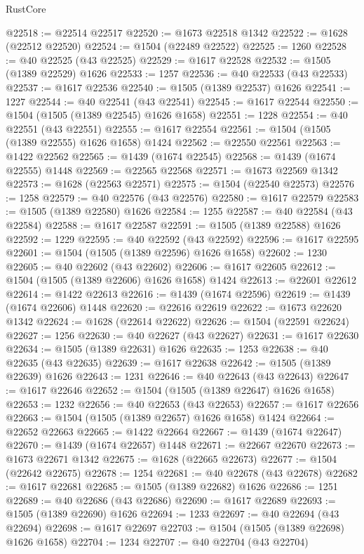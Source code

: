 \begin{lexlean}{RustCore}
\begin{coremodule}
@22518 := @22514 @22517
@22520 := @1673 @22518 @1342
@22522 := @1628 (@22512 @22520)
@22524 := @1504 (@22489 @22522)
@22525 := 1260
@22528 := @40 @22525 (@43 @22525)
@22529 := @1617 @22528
@22532 := @1505 (@1389 @22529) @1626
@22533 := 1257
@22536 := @40 @22533 (@43 @22533)
@22537 := @1617 @22536
@22540 := @1505 (@1389 @22537) @1626
@22541 := 1227
@22544 := @40 @22541 (@43 @22541)
@22545 := @1617 @22544
@22550 := @1504 (@1505 (@1389 @22545) @1626 @1658)
@22551 := 1228
@22554 := @40 @22551 (@43 @22551)
@22555 := @1617 @22554
@22561 := @1504 (@1505 (@1389 @22555) @1626 @1658) @1424
@22562 := @22550 @22561
@22563 := @1422 @22562
@22565 := @1439 (@1674 @22545)
@22568 := @1439 (@1674 @22555) @1448
@22569 := @22565 @22568
@22571 := @1673 @22569 @1342
@22573 := @1628 (@22563 @22571)
@22575 := @1504 (@22540 @22573)
@22576 := 1258
@22579 := @40 @22576 (@43 @22576)
@22580 := @1617 @22579
@22583 := @1505 (@1389 @22580) @1626
@22584 := 1255
@22587 := @40 @22584 (@43 @22584)
@22588 := @1617 @22587
@22591 := @1505 (@1389 @22588) @1626
@22592 := 1229
@22595 := @40 @22592 (@43 @22592)
@22596 := @1617 @22595
@22601 := @1504 (@1505 (@1389 @22596) @1626 @1658)
@22602 := 1230
@22605 := @40 @22602 (@43 @22602)
@22606 := @1617 @22605
@22612 := @1504 (@1505 (@1389 @22606) @1626 @1658) @1424
@22613 := @22601 @22612
@22614 := @1422 @22613
@22616 := @1439 (@1674 @22596)
@22619 := @1439 (@1674 @22606) @1448
@22620 := @22616 @22619
@22622 := @1673 @22620 @1342
@22624 := @1628 (@22614 @22622)
@22626 := @1504 (@22591 @22624)
@22627 := 1256
@22630 := @40 @22627 (@43 @22627)
@22631 := @1617 @22630
@22634 := @1505 (@1389 @22631) @1626
@22635 := 1253
@22638 := @40 @22635 (@43 @22635)
@22639 := @1617 @22638
@22642 := @1505 (@1389 @22639) @1626
@22643 := 1231
@22646 := @40 @22643 (@43 @22643)
@22647 := @1617 @22646
@22652 := @1504 (@1505 (@1389 @22647) @1626 @1658)
@22653 := 1232
@22656 := @40 @22653 (@43 @22653)
@22657 := @1617 @22656
@22663 := @1504 (@1505 (@1389 @22657) @1626 @1658) @1424
@22664 := @22652 @22663
@22665 := @1422 @22664
@22667 := @1439 (@1674 @22647)
@22670 := @1439 (@1674 @22657) @1448
@22671 := @22667 @22670
@22673 := @1673 @22671 @1342
@22675 := @1628 (@22665 @22673)
@22677 := @1504 (@22642 @22675)
@22678 := 1254
@22681 := @40 @22678 (@43 @22678)
@22682 := @1617 @22681
@22685 := @1505 (@1389 @22682) @1626
@22686 := 1251
@22689 := @40 @22686 (@43 @22686)
@22690 := @1617 @22689
@22693 := @1505 (@1389 @22690) @1626
@22694 := 1233
@22697 := @40 @22694 (@43 @22694)
@22698 := @1617 @22697
@22703 := @1504 (@1505 (@1389 @22698) @1626 @1658)
@22704 := 1234
@22707 := @40 @22704 (@43 @22704)

\end{coremodule}
\end{lexlean}
